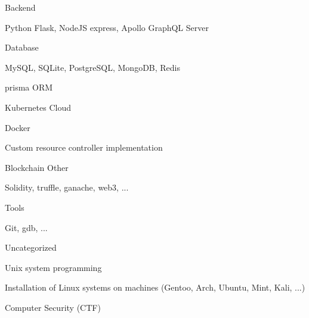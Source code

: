 \begin{cventries}
  \cventry
    {Backend}
    {}
    {}
    {}
    {
      \begin{cvitems}
        \item {Python Flask, NodeJS express, Apollo GraphQL Server}
      \end{cvitems}
    }
    
  \cventry
    {Database}
    {}
    {}
    {}
    {
      \begin{cvitems}
        \item {MySQL, SQLite, PostgreSQL, MongoDB, Redis}
        \item {prisma ORM}
      \end{cvitems}
    }

  \cventry
    {Kubernetes}
    {Cloud}
    {}
    {}
    {
      \begin{cvitems}
        \item {Docker}
        \item {Custom resource controller implementation}
      \end{cvitems}
    }

  \cventry
    {Blockchain}
    {Other}
    {}
    {}
    {
      \begin{cvitems}
        \item {Solidity, truffle, ganache, web3, ...}
      \end{cvitems}
    }

  \cventry
    {Tools}
    {}
    {}
    {}
    {
      \begin{cvitems}
        \item {Git, gdb, ...}
      \end{cvitems}
    }
    
  \cventry
    {Uncategorized}
    {}
    {}
    {}
    {
      \begin{cvitems}
        \item {Unix system programming}
        \item {Installation of Linux systems on machines (Gentoo, Arch, Ubuntu, Mint, Kali, ...)}
        \item {Computer Security (CTF)}
      \end{cvitems}
    }
    

\end{cventries}
